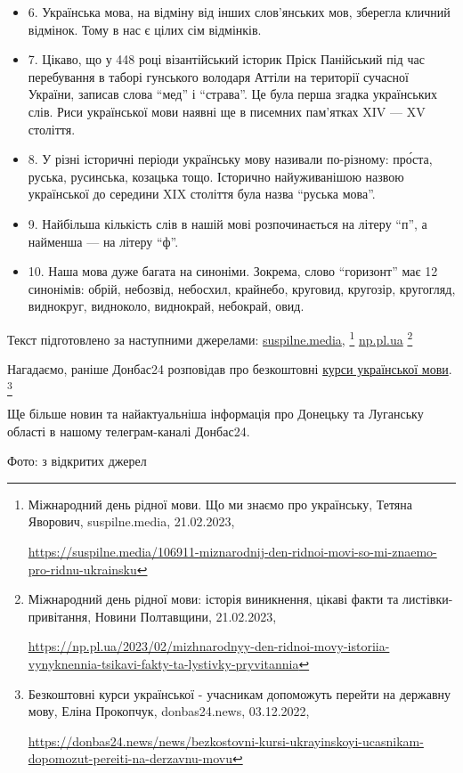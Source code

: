 \begin{itemize} %
\item	6. Українська мова, на відміну від інших слов'янських мов, зберегла кличний відмінок. Тому в нас є цілих сім відмінків.

\item 7. Цікаво, що у 448 році візантійський історик Пріск Панійський під час
перебування в таборі гунського володаря Аттіли на території сучасної
України, записав слова \enquote{мед} і \enquote{страва}. Це була перша згадка
українських слів. Риси української мови наявні ще в писемних
пам'ятках XIV — XV століття.

\item 8. У різні історичні періоди українську мову називали по-різному: про́ста,
руська, русинська, козацька тощо. Історично найуживанішою назвою
української до середини XIX століття була назва \enquote{руська мова}.

\item 9. Найбільша кількість слів в нашій мові розпочинається на літеру \enquote{п}, а найменша — на літеру \enquote{ф}.

\item 10. Наша мова дуже багата на синоніми. Зокрема, слово \enquote{горизонт} має 12
синонімів: обрій, небозвід, небосхил, крайнебо, круговид, кругозір,
кругогляд, виднокруг, видноколо, виднокрай, небокрай, овид.
\end{itemize} %

Текст підготовлено за наступними джерелами: \href{https://suspilne.media/106911-miznarodnij-den-ridnoi-movi-so-mi-znaemo-pro-ridnu-ukrainsku}{suspilne.media},%
\footnote{Міжнародний день рідної мови. Що ми знаємо про українську, Тетяна Яворович, suspilne.media, 21.02.2023, \par\url{https://suspilne.media/106911-miznarodnij-den-ridnoi-movi-so-mi-znaemo-pro-ridnu-ukrainsku}}
\href{https://np.pl.ua/2023/02/mizhnarodnyy-den-ridnoi-movy-istoriia-vynyknennia-tsikavi-fakty-ta-lystivky-pryvitannia}{np.pl.ua}%
\footnote{Міжнародний день рідної мови: історія виникнення, цікаві факти та листівки-привітання, Новини Полтавщини, 21.02.2023, \par\url{https://np.pl.ua/2023/02/mizhnarodnyy-den-ridnoi-movy-istoriia-vynyknennia-tsikavi-fakty-ta-lystivky-pryvitannia}}

Нагадаємо, раніше Донбас24 розповідав про безкоштовні \href{https://donbas24.news/news/bezkostovni-kursi-ukrayinskoyi-ucasnikam-dopomozut-pereiti-na-derzavnu-movu}{курси української мови}.%
\footnote{Безкоштовні курси української - учасникам допоможуть перейти на державну мову, Еліна Прокопчук, donbas24.news, 03.12.2022, \par\url{https://donbas24.news/news/bezkostovni-kursi-ukrayinskoyi-ucasnikam-dopomozut-pereiti-na-derzavnu-movu}}

Ще більше новин та найактуальніша інформація про Донецьку та Луганську області
в нашому телеграм-каналі Донбас24.

Фото: з відкритих джерел

